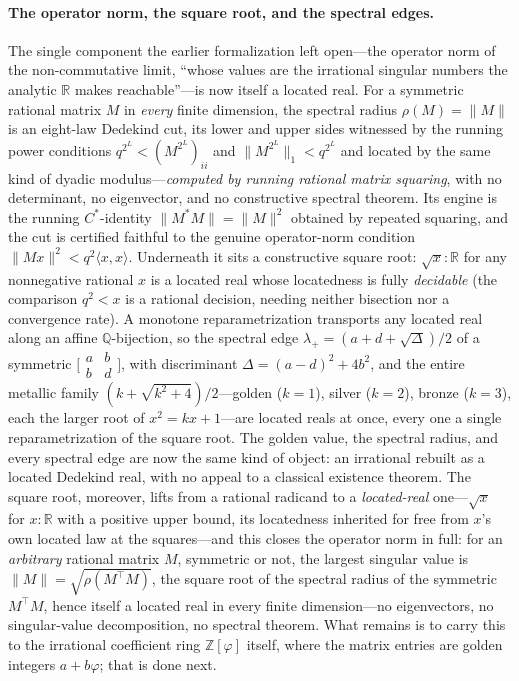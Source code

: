 \documentclass[11pt,letterpaper]{article}
\theoremstyle{plain}
\theoremstyle{definition}
\theoremstyle{remark}
\newcommand{\ZZ}{\mathbb{Z}}
\newcommand{\QQ}{\mathbb{Q}}
\newcommand{\RR}{\mathbb{R}}
\newcommand{\Zphi}{\ZZ[\varphi]}
\begin{document}
\paragraph{The operator norm, the square root, and the spectral edges.}
The single component the earlier formalization left open---the operator norm of the
non-commutative limit, ``whose values are the irrational singular numbers the
analytic $\RR$ makes reachable''---is now itself a located real. For a symmetric
rational matrix $M$ in \emph{every} finite dimension, the spectral radius
$\rho(M)=\|M\|$ is an eight-law Dedekind cut, its lower and upper sides witnessed by
the running power conditions $q^{2^L}<(M^{2^L})_{ii}$ and $\|M^{2^L}\|_1<q^{2^L}$ and
located by the same kind of dyadic modulus---\emph{computed by running rational
matrix squaring}, with no determinant, no eigenvector, and no constructive spectral
theorem. Its engine is the running $C^\ast$-identity $\|M^\ast M\|=\|M\|^2$ obtained
by repeated squaring, and the cut is certified faithful to the genuine operator-norm
condition $\|Mx\|^2<q^2\langle x,x\rangle$. Underneath it sits a constructive square
root: $\sqrt{x}:\RR$ for any nonnegative rational $x$ is a located real whose
locatedness is fully \emph{decidable} (the comparison $q^2<x$ is a rational decision,
needing neither bisection nor a convergence rate). A monotone reparametrization
transports any located real along an affine $\QQ$-bijection, so the spectral edge
$\lambda_+=(a+d+\sqrt\Delta)/2$ of a symmetric
$\bigl[\begin{smallmatrix}a&b\\b&d\end{smallmatrix}\bigr]$, with discriminant
$\Delta=(a-d)^2+4b^2$, and the entire metallic family $(k+\sqrt{k^2+4})/2$---golden
($k{=}1$), silver ($k{=}2$), bronze ($k{=}3$), each the larger root of
$x^2=kx+1$---are located reals at once, every one a single reparametrization of the
square root. The golden value, the spectral radius, and every spectral edge are now
the same kind of object: an irrational rebuilt as a located Dedekind real, with no
appeal to a classical existence theorem. The square root, moreover, lifts from a
rational radicand to a \emph{located-real} one---$\sqrt{x}$ for $x:\RR$ with a positive
upper bound, its locatedness inherited for free from $x$'s own located law at the
squares---and this closes the operator norm in full: for an \emph{arbitrary} rational
matrix $M$, symmetric or not, the largest singular value is $\|M\|=\sqrt{\rho(M^{\!\top}\!M)}$,
the square root of the spectral radius of the symmetric $M^{\!\top}\!M$, hence itself a
located real in every finite dimension---no eigenvectors, no singular-value
decomposition, no spectral theorem. What remains is to carry this to the irrational
coefficient ring $\Zphi$ itself, where the matrix entries are golden integers
$a+b\varphi$; that is done next.
\end{document}
